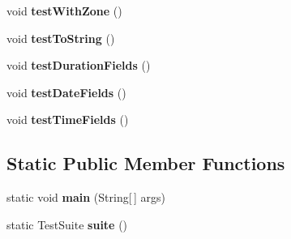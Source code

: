 \begin{DoxyCompactItemize}
\item 
\hypertarget{classorg_1_1joda_1_1time_1_1chrono_1_1_test_julian_chronology_acad5ef0aa6cdd6a9d13b1b0e57204716}{void {\bfseries test\-With\-Zone} ()}\label{classorg_1_1joda_1_1time_1_1chrono_1_1_test_julian_chronology_acad5ef0aa6cdd6a9d13b1b0e57204716}

\item 
\hypertarget{classorg_1_1joda_1_1time_1_1chrono_1_1_test_julian_chronology_a1b2d5f2fd550dbeab1ed957418703400}{void {\bfseries test\-To\-String} ()}\label{classorg_1_1joda_1_1time_1_1chrono_1_1_test_julian_chronology_a1b2d5f2fd550dbeab1ed957418703400}

\item 
\hypertarget{classorg_1_1joda_1_1time_1_1chrono_1_1_test_julian_chronology_a8cbc78f91be96caff766ac82876366bc}{void {\bfseries test\-Duration\-Fields} ()}\label{classorg_1_1joda_1_1time_1_1chrono_1_1_test_julian_chronology_a8cbc78f91be96caff766ac82876366bc}

\item 
\hypertarget{classorg_1_1joda_1_1time_1_1chrono_1_1_test_julian_chronology_a370d9f29cac671ad0852b5ea2a00b12f}{void {\bfseries test\-Date\-Fields} ()}\label{classorg_1_1joda_1_1time_1_1chrono_1_1_test_julian_chronology_a370d9f29cac671ad0852b5ea2a00b12f}

\item 
\hypertarget{classorg_1_1joda_1_1time_1_1chrono_1_1_test_julian_chronology_a26440425aa0e8cb31b2dba8c2a434682}{void {\bfseries test\-Time\-Fields} ()}\label{classorg_1_1joda_1_1time_1_1chrono_1_1_test_julian_chronology_a26440425aa0e8cb31b2dba8c2a434682}

\end{DoxyCompactItemize}
\subsection*{Static Public Member Functions}
\begin{DoxyCompactItemize}
\item 
\hypertarget{classorg_1_1joda_1_1time_1_1chrono_1_1_test_julian_chronology_aa6f61459ed75de121bf14927a4bc366e}{static void {\bfseries main} (String\mbox{[}$\,$\mbox{]} args)}\label{classorg_1_1joda_1_1time_1_1chrono_1_1_test_julian_chronology_aa6f61459ed75de121bf14927a4bc366e}

\item 
\hypertarget{classorg_1_1joda_1_1time_1_1chrono_1_1_test_julian_chronology_a38273a5026fc1c870ea2eb9caa843ca4}{static Test\-Suite {\bfseries suite} ()}\label{classorg_1_1joda_1_1time_1_1chrono_1_1_test_julian_chronology_a38273a5026fc1c870ea2eb9caa843ca4}

\end{DoxyCompactItemize}

